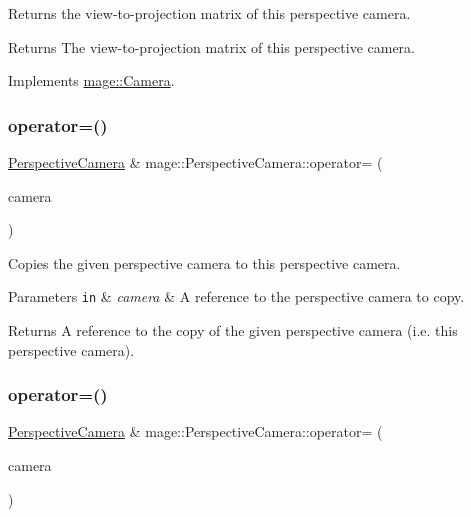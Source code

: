 Returns the view-\/to-\/projection matrix of this perspective camera.

\begin{DoxyReturn}{Returns}
The view-\/to-\/projection matrix of this perspective camera. 
\end{DoxyReturn}


Implements \hyperlink{classmage_1_1_camera_ad3e8380ba9718a983f72d753d08f556e}{mage\+::\+Camera}.

\hypertarget{classmage_1_1_perspective_camera_a0fe5ef8bd4d28efa8e4851a8055b6fa5}{}\label{classmage_1_1_perspective_camera_a0fe5ef8bd4d28efa8e4851a8055b6fa5} 
\subsubsection{\texorpdfstring{operator=()}{operator=()}\hspace{0.1cm}{\footnotesize\ttfamily [1/2]}}
{\footnotesize\ttfamily \hyperlink{classmage_1_1_perspective_camera}{Perspective\+Camera} \& mage\+::\+Perspective\+Camera\+::operator= (\begin{DoxyParamCaption}\item[{const \hyperlink{classmage_1_1_perspective_camera}{Perspective\+Camera} \&}]{camera }\end{DoxyParamCaption})\hspace{0.3cm}{\ttfamily [default]}}

Copies the given perspective camera to this perspective camera.


\begin{DoxyParams}[1]{Parameters}
\mbox{\tt in}  & {\em camera} & A reference to the perspective camera to copy. \\
\hline
\end{DoxyParams}
\begin{DoxyReturn}{Returns}
A reference to the copy of the given perspective camera (i.\+e. this perspective camera). 
\end{DoxyReturn}
\hypertarget{classmage_1_1_perspective_camera_a338c75900237f3623b31b0231a5f5782}{}\label{classmage_1_1_perspective_camera_a338c75900237f3623b31b0231a5f5782} 
\subsubsection{\texorpdfstring{operator=()}{operator=()}\hspace{0.1cm}{\footnotesize\ttfamily [2/2]}}
{\footnotesize\ttfamily \hyperlink{classmage_1_1_perspective_camera}{Perspective\+Camera} \& mage\+::\+Perspective\+Camera\+::operator= (\begin{DoxyParamCaption}\item[{\hyperlink{classmage_1_1_perspective_camera}{Perspective\+Camera} \&\&}]{camera }\end{DoxyParamCaption})\hspace{0.3cm}{\ttfamily [default]}}

